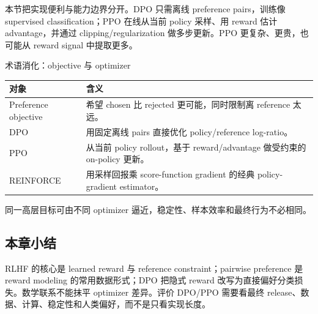 本节把实现便利与能力边界分开。DPO 只需离线 preference pairs，训练像 supervised classification；PPO 在线从当前 policy 采样、用 reward 估计 advantage，并通过 clipping/regularization 做多步更新。PPO 更复杂、更贵，也可能从 reward signal 中提取更多。



\begin{knowledgebox}{术语消化：objective 与 optimizer}
\begin{tabularx}{\textwidth}{L{0.18\textwidth} X}
\toprule
对象 & 含义 \\
\midrule
Preference objective & 希望 chosen 比 rejected 更可能，同时限制离 reference 太远。 \\
DPO & 用固定离线 pairs 直接优化 policy/reference log-ratio。 \\
PPO & 从当前 policy rollout，基于 reward/advantage 做受约束的 on-policy 更新。 \\
REINFORCE & 用采样回报乘 score-function gradient 的经典 policy-gradient estimator。 \\
\bottomrule
\end{tabularx}
同一高层目标可由不同 optimizer 逼近，稳定性、样本效率和最终行为不必相同。
\end{knowledgebox}


\subsection{本章小结}

RLHF 的核心是 learned reward 与 reference constraint；pairwise preference 是 reward modeling 的常用数据形式；DPO 把隐式 reward 改写为直接偏好分类损失。数学联系不能抹平 optimizer 差异。评价 DPO/PPO 需要看最终 release、数据、计算、稳定性和人类偏好，而不是只看实现长度。

